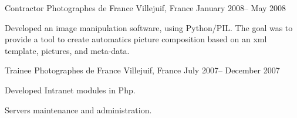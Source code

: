 \begin{cventries}
  \cventry
    {Contractor} %
    {Photographes de France} %
    {Villejuif, France} %
    {January 2008– May 2008} %
    {
      \begin{cvitems} %
        \item {Developed an image manipulation software, using Python/PIL.
The goal was to provide a tool to create automatics picture composition based on an xml template, pictures, and meta-data.}
        \end{cvitems}
    }

  \cventry
    {Trainee} %
    {Photographes de France} %
    {Villejuif, France} %
    {July 2007– December 2007} %
    {
      \begin{cvitems} %
        \item {Developed Intranet modules in Php.}
        \item {Servers maintenance and administration.}
      \end{cvitems}
    }

\end{cventries}
